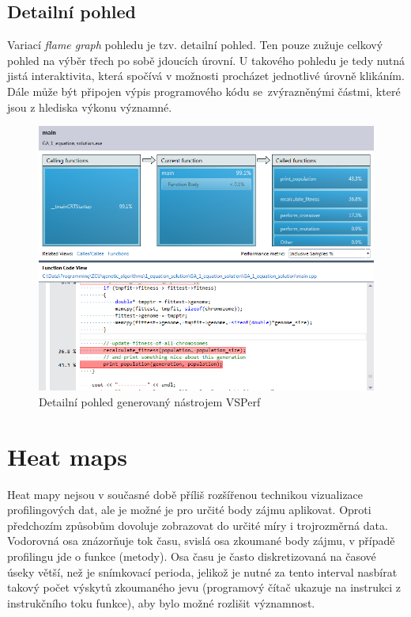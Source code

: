 \documentclass[czech,BP]{thesiskiv}
\begin{document}
\subsection{Detailní pohled}

Variací \emph{flame graph} pohledu je tzv. detailní pohled. Ten pouze zužuje celkový pohled na výběr třech po sobě jdoucích úrovní. U takového pohledu je tedy nutná jistá interaktivita, která spočívá v možnosti procházet jednotlivé úrovně klikáním. Dále může být připojen výpis programového kódu se~zvýrazněnými částmi, které jsou z hlediska výkonu významné.

\begin{figure}[h]
    \centering
    \includegraphics[interpolate,width=1.0\textwidth]{img/prof_detailgraph.png}
    \caption{Detailní pohled generovaný nástrojem VSPerf}
    \label{obr:detailview}
\end{figure}

\section {Heat maps}

Heat mapy nejsou v současné době příliš rozšířenou technikou vizualizace profilingových dat, ale je možné je pro určité body zájmu aplikovat\cite{heatmapcite}. Oproti předchozím způsobům dovoluje zobrazovat do určité míry i trojrozměrná data. Vodorovná osa znázorňuje tok času, svislá osa zkoumané body zájmu, v případě profilingu jde o funkce (metody). Osa času je často diskretizovaná na časové úseky větší, než je snímkovací perioda, jelikož je nutné za tento interval nasbírat takový počet výskytů zkoumaného jevu (programový čítač ukazuje na instrukci z instrukčního toku funkce), aby bylo možné rozlišit významnost.
\end{document}
